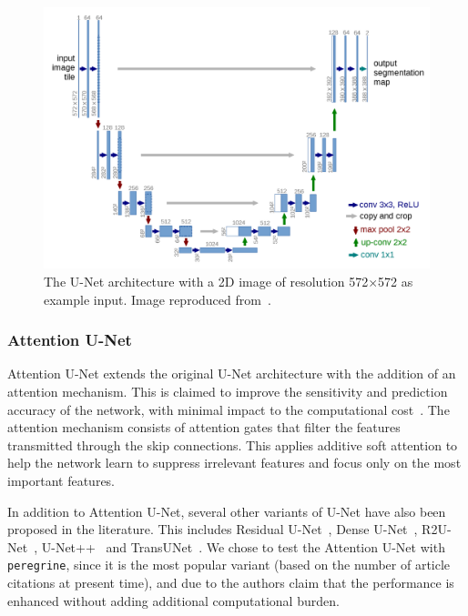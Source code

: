 \begin{figure}[tb]
    \centering
    \includegraphics[width=1\linewidth]{media/images/UNet_arch.png}
    \caption{The U-Net architecture with a 2D image of resolution 572$\times$572 as example input. Image reproduced from~\cite{Ronneberger_Fischer_Brox_2015}.}
    \label{fig:unet_arch}
\end{figure}

\subsubsection{Attention U-Net}

Attention U-Net extends the original U-Net architecture with the addition of an attention mechanism. This is claimed to improve the sensitivity and prediction accuracy of the network, with minimal impact to the computational cost~\cite{Oktay_2018_AUNet}. The attention mechanism consists of attention gates that filter the features transmitted through the skip connections. This applies additive soft attention to help the network learn to suppress irrelevant features and focus only on the most important features.

In addition to Attention U-Net, several other variants of U-Net have also been proposed in the literature. This includes Residual U-Net~\cite{Zhang_resunet_2018}, Dense U-Net~\cite{Wang_dense_unet_2019}, R2U-Net~\cite{Alom_r2unet_2018}, U-Net++~\cite{Zhou_2018_unet++} and TransUNet~\cite{Chen_transunet_2021}. We chose to test the Attention U-Net with \texttt{peregrine}, since it is the most popular variant (based on the number of article citations at present time), and due to the authors claim that the performance is enhanced without adding additional computational burden.

